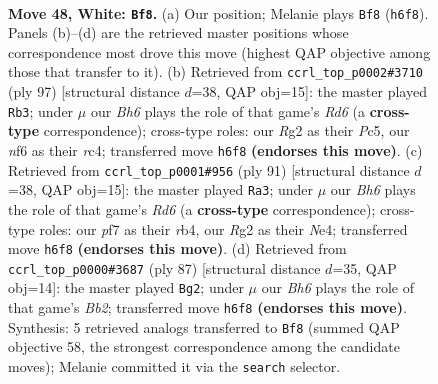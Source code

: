 \documentclass[11pt]{article}
\begin{document}
\clearpage

\begin{figure}[p]\centering
\begin{subfigure}{0.46\textwidth}\centering
\resizebox{\linewidth}{!}{%
\newchessgame
\chessboard[
  setfen={8/5p1k/5n1B/8/p3p2p/P1Kp3P/1P3PR1/1r6 w - - 3 48},
  showmover=false,
  pgfstyle=straightmove, color=movearrow, markmove={h6-f8}
]}
\caption{}
\end{subfigure}\hfill
\begin{subfigure}{0.46\textwidth}\centering
\resizebox{\linewidth}{!}{%
\newchessgame
\chessboard[
  setfen={8/1p3kp1/p7/P1p2PpP/2R1K1P1/3r4/1P6/8 b - - 0 49},
  showmover=false,
  pgfstyle=straightmove, color=movearrow, markmove={d3-b3}
]}
\caption{}
\end{subfigure}
\\[4pt]
\begin{subfigure}{0.46\textwidth}\centering
\resizebox{\linewidth}{!}{%
\newchessgame
\chessboard[
  setfen={8/5ppk/4p3/4P3/1R1NnPPp/3r4/4K2P/8 b - - 1 46},
  showmover=false,
  pgfstyle=straightmove, color=movearrow, markmove={d3-a3}
]}
\caption{}
\end{subfigure}\hfill
\begin{subfigure}{0.46\textwidth}\centering
\resizebox{\linewidth}{!}{%
\newchessgame
\chessboard[
  setfen={8/1b3pp1/4k2p/P1p1P3/r1P3P1/1R5P/3NK3/8 b - - 1 44},
  showmover=false,
  pgfstyle=straightmove, color=movearrow, markmove={b7-g2}
]}
\caption{}
\end{subfigure}
\caption{\textbf{Move 48, White: \texttt{Bf8}.} (a) Our position; Melanie plays \texttt{Bf8} (\texttt{h6f8}). Panels (b)--(d) are the retrieved master positions whose correspondence most drove this move (highest QAP objective among those that transfer to it). (b) Retrieved from \texttt{ccrl\_top\_p0002\#3710} (ply 97) [structural distance $d$=38, QAP obj=15]: the master played \texttt{Rb3}; under $\mu$ our \emph{Bh6} plays the role of that game's \emph{Rd6} (a \textbf{cross-type} correspondence); cross-type roles: our \emph{R}g2 as their \emph{P}c5, our \emph{n}f6 as their \emph{r}c4; transferred move \texttt{h6f8} \textbf{(endorses this move)}. (c) Retrieved from \texttt{ccrl\_top\_p0001\#956} (ply 91) [structural distance $d$=38, QAP obj=15]: the master played \texttt{Ra3}; under $\mu$ our \emph{Bh6} plays the role of that game's \emph{Rd6} (a \textbf{cross-type} correspondence); cross-type roles: our \emph{p}f7 as their \emph{r}b4, our \emph{R}g2 as their \emph{N}e4; transferred move \texttt{h6f8} \textbf{(endorses this move)}. (d) Retrieved from \texttt{ccrl\_top\_p0000\#3687} (ply 87) [structural distance $d$=35, QAP obj=14]: the master played \texttt{Bg2}; under $\mu$ our \emph{Bh6} plays the role of that game's \emph{Bb2}; transferred move \texttt{h6f8} \textbf{(endorses this move)}. Synthesis: 5 retrieved analogs transferred to \texttt{Bf8} (summed QAP objective 58, the strongest correspondence among the candidate moves); Melanie committed it via the \texttt{search} selector.}
\label{fig:thought-m94}
\end{figure}
\end{document}
